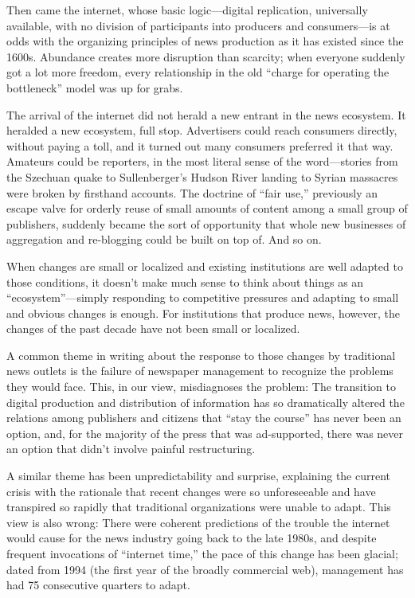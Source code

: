 Then came the internet, whose basic logic—digital replication, universally available,
with no division of participants into producers and consumers—is at odds
with the organizing principles of news production as it has existed since the
1600s. Abundance creates more disruption than scarcity; when everyone suddenly
got a lot more freedom, every relationship in the old ``charge for operating
the bottleneck'' model was up for grabs.

The arrival of the internet did not herald a new entrant in the news ecosystem.
It heralded a new ecosystem, full stop. Advertisers could reach consumers directly,
without paying a toll, and it turned out many consumers preferred it that way.
Amateurs could be reporters, in the most literal sense of the word—stories from
the Szechuan quake to Sullenberger’s Hudson River landing to Syrian massacres
were broken by firsthand accounts. The doctrine of ``fair use,'' previously an
escape valve for orderly reuse of small amounts of content among a small group
of publishers, suddenly became the sort of opportunity that whole new businesses
of aggregation and re-blogging could be built on top of. And so on.

When changes are small or localized and existing institutions are well adapted
to those conditions, it doesn’t make much sense to think about things as an
``ecosystem''—simply responding to competitive pressures and adapting to small
and obvious changes is enough. For institutions that produce news, however, the
changes of the past decade have not been small or localized.

A common theme in writing about the response to those changes by traditional
news outlets is the failure of newspaper management to recognize the problems
they would face. This, in our view, misdiagnoses the problem: The transition to
digital production and distribution of information has so dramatically altered the relations among publishers and citizens that ``stay the course'' has never been an
option, and, for the majority of the press that was ad-supported, there was never
an option that didn’t involve painful restructuring.

A similar theme has been unpredictability and surprise, explaining the current
crisis with the rationale that recent changes were so unforeseeable and have
transpired so rapidly that traditional organizations were unable to adapt. This
view is also wrong: There were coherent predictions of the trouble the internet
would cause for the news industry going back to the late 1980s, and despite
frequent invocations of ``internet time,'' the pace of this change has been glacial;
dated from 1994 (the first year of the broadly commercial web), management has
had 75 consecutive quarters to adapt.

